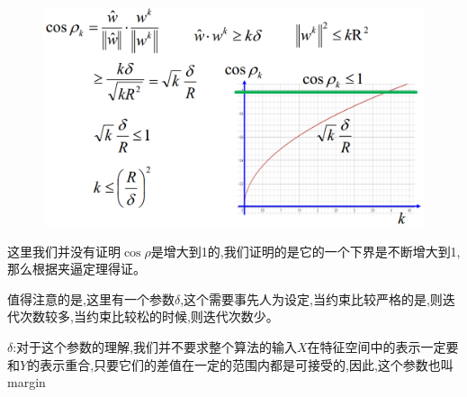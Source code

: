 \documentclass[UTF8,a4paper]{ctexart}
\begin{document}
        \begin{figure}[H]
            \centering
            \includegraphics[scale = 0.3]{assets/ML_78f61.png}
        \end{figure}

        {\color{blue}
        这里我们并没有证明$\cos \rho$是增大到1的,我们证明的是它的一个下界是不断增大到1,那么根据夹逼定理得证。

        值得注意的是,这里有一个参数$\delta$,这个需要事先人为设定,当约束比较严格的是,则迭代次数较多,当约束比较松的时候,则迭代次数少。

        $\delta$:对于这个参数的理解,我们并不要求整个算法的输入$X$在特征空间中的表示一定要和$Y$的表示重合,只要它们的差值在一定的范围内都是可接受的,因此,这个参数也叫margin
        }
\end{document}
